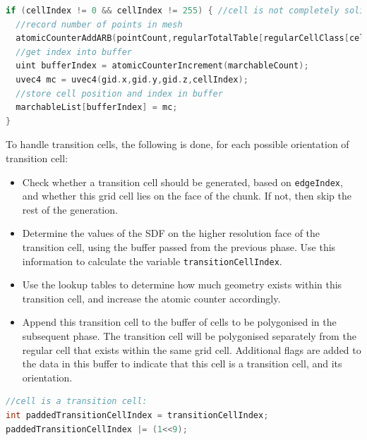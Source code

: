 \documentclass[11pt]{article}
\begin{document}
\begin{enumerate}
\begin{lstlisting}[language=C++,label={tv_count_regular},caption={GLSL code for counting the number of vertices and marchable grid cells in the chunk. Variable \texttt{cellIndex} is calculated according to listing \ref{tv_transition_tables}, using the SDF values from the previous stage.}]
if (cellIndex != 0 && cellIndex != 255) { //cell is not completely solid or air
  //record number of points in mesh
  atomicCounterAddARB(pointCount,regularTotalTable[regularCellClass[cellIndex]]);
  //get index into buffer
  uint bufferIndex = atomicCounterIncrement(marchableCount);
  uvec4 mc = uvec4(gid.x,gid.y,gid.z,cellIndex);
  //store cell position and index in buffer
  marchableList[bufferIndex] = mc;
}
\end{lstlisting}
To handle transition cells, the following is done, for each possible orientation of transition cell:
  \begin{itemize}
    \item Check whether a transition cell should be generated, based on \texttt{edgeIndex}, and whether this grid cell lies on the face of the chunk. If not, then skip the rest of the generation.
    \item Determine the values of the SDF on the higher resolution face of the transition cell, using the buffer passed from the previous phase. Use this information to calculate the variable \texttt{transitionCellIndex}.
    \item Use the lookup tables to determine how much geometry exists within this transition cell, and increase the atomic counter accordingly.
    \item Append this transition cell to the buffer of cells to be polygonised in the subsequent phase. The transition cell will be polygonised separately from the regular cell that exists within the same grid cell. Additional flags are added to the data in this buffer to indicate that this cell is a transition cell, and its orientation.
  \end{itemize}
\begin{lstlisting}[language=C++,label={tv_count},caption={Part of the code responsible for counting the triangles in transition cells, and appending them to the geometry generation buffer. The first 9 bits of \texttt{paddedTransitionCellIndex} store the value of \texttt{transitionCellIndex}, calculated as shown in figure \ref{fig:tv_transition_cellIndex}. The 10th bit records that the cell is a transition cell, and bits 11-16 are a mask identifying the orientation of the transition cell.}]
//cell is a transition cell:
int paddedTransitionCellIndex = transitionCellIndex;
paddedTransitionCellIndex |= (1<<9);


\end{lstlisting}
\end{enumerate}
\end{document}
